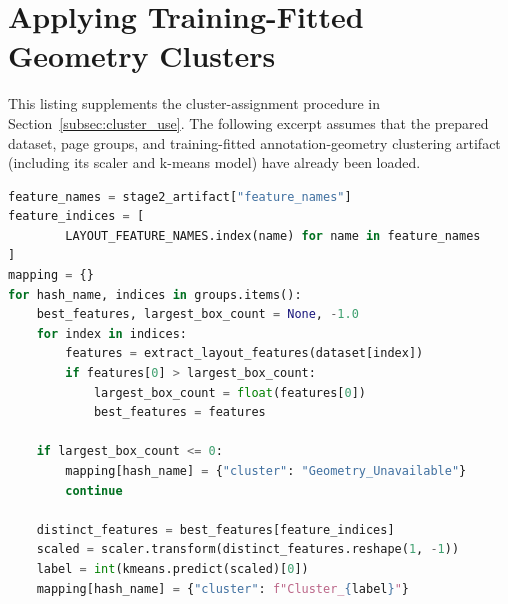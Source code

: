 \section{Applying Training-Fitted Geometry Clusters}
\label{app:cluster-assignment}

This listing supplements the cluster-assignment procedure in
Section~\ref{subsec:cluster_use}. The following excerpt assumes that the
prepared dataset, page groups, and training-fitted annotation-geometry
clustering artifact (including its scaler and k-means model) have already been
loaded.

\begin{lstlisting}[language=Python,
  basicstyle=\ttfamily\fontsize{6.5}{7.2}\selectfont,
  aboveskip=0.25\baselineskip,
  xleftmargin=22pt,
  framexleftmargin=19pt,
  numbersep=6pt,
  caption={Assignment of test pages with the frozen training-fitted
  annotation-geometry scaler and k-means model}]
feature_names = stage2_artifact["feature_names"]
feature_indices = [
        LAYOUT_FEATURE_NAMES.index(name) for name in feature_names
]
mapping = {}
for hash_name, indices in groups.items():
    best_features, largest_box_count = None, -1.0
    for index in indices:
        features = extract_layout_features(dataset[index])
        if features[0] > largest_box_count:
            largest_box_count = float(features[0])
            best_features = features

    if largest_box_count <= 0:
        mapping[hash_name] = {"cluster": "Geometry_Unavailable"}
        continue

    distinct_features = best_features[feature_indices]
    scaled = scaler.transform(distinct_features.reshape(1, -1))
    label = int(kmeans.predict(scaled)[0])
    mapping[hash_name] = {"cluster": f"Cluster_{label}"}
\end{lstlisting}
